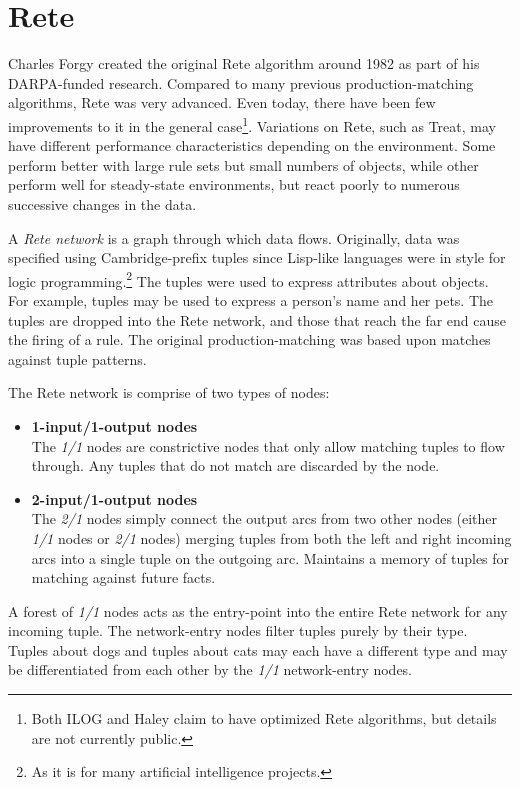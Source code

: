 \section{Rete}
\label{algo.rete}

Charles Forgy created the original Rete algorithm\cite{forgy82rete} 
around 1982 as part
of his DARPA-funded research.  Compared to many previous
production-matching algorithms, Rete was very advanced.  Even today,
there have been few improvements to it in the general
case\footnote{Both ILOG and Haley claim to have optimized Rete
algorithms, but details are not currently public.}.  Variations on 
Rete, such as Treat, may have different performance characteristics
depending on the environment.  Some perform better with large rule 
sets but small numbers of objects, while other perform well for 
steady-state environments, but react poorly to numerous successive 
changes in the data.

A \emph{Rete network} is a graph through which data flows.
Originally, data was specified using Cambridge-prefix tuples since
Lisp-like languages were in style for logic programming.\footnote{As it is for many artificial
intelligence projects.}  The tuples were used to express attributes
about objects.  For example, tuples may be used to express a person's
name and her pets.  The tuples are dropped into the Rete network,
and those that reach the far end cause the firing of a rule.
The original production-matching was based upon matches against
tuple patterns.

\bigskip

The Rete network is comprise of two types of nodes:

\begin{itemize}
	\item \textbf{\textsf{1-input/1-output nodes}}\\
		The \emph{1/1} nodes are
		constrictive nodes that only allow matching tuples to
		flow through.  Any tuples that do not match are discarded
		by the node.
	\item \textbf{\textsf{2-input/1-output nodes}}\\
		The \emph{2/1} nodes simply connect the output arcs from two
		other nodes (either \emph{1/1} nodes or \emph{2/1} nodes) merging
		tuples from both the left and right incoming arcs
		into a single tuple on the outgoing arc.  Maintains a memory
		of tuples for matching against future facts.
\end{itemize}

A forest of \emph{1/1} nodes acts as the entry-point
into the entire Rete network for any incoming tuple.  The
network-entry  nodes filter tuples purely by their type.  
Tuples about dogs and tuples about cats may 
each have a different type and may be differentiated from each 
other by the \emph{1/1} network-entry nodes.

